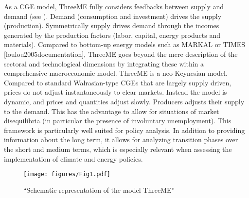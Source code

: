 \documentclass[
  letterpaper,
  DIV=11,
  numbers=noendperiod]{scrartcl}
\begin{document}
As a CGE model, ThreeME fully considers feedbacks between supply and
demand (see \citet{fig1}). Demand (consumption and investment) drives
the supply (production). Symmetrically supply drives demand through the
incomes generated by the production factors (labor, capital, energy
products and materials). Compared to bottom-up energy models such as
MARKAL \citep{markal1981} or TIMES {[}loulou2005documentation{]},
ThreeME goes beyond the mere description of the sectoral and
technological dimensions by integrating these within a comprehensive
macroeconomic model. ThreeME is a neo-Keynesian model. Compared to
standard Walrasian-type CGEs that are largely supply driven, prices do
not adjust instantaneously to clear markets. Instead the model is
dynamic, and prices and quantities adjust slowly. Producers adjusts
their supply to the demand. This has the advantage to allow for
situations of market disequilibria (in particular the presence of
involuntary unemployment). This framework is particularly well suited
for policy analysis. In addition to providing information about the long
term, it allows for analyzing transition phases over the short and
medium terms, which is especially relevant when assessing the
implementation of climate and energy policies.

\begin{figure}

{\centering \texttt{[image: figures/Fig1.pdf]}

}

\caption{``Schematic representation of the model ThreeME''}

\end{figure}
\end{document}
